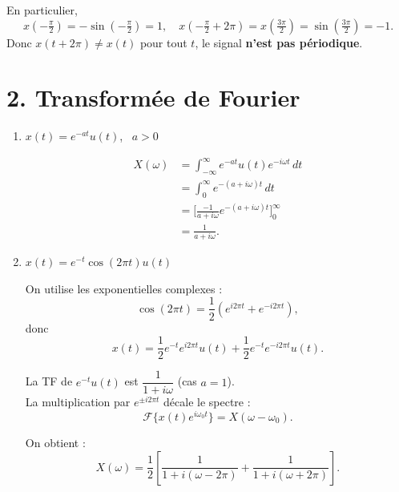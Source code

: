 \begin{solution}
\begin{enumerate}[label=(\alph*)]
        En particulier, 
        \[
           x(-\tfrac{\pi}{2}) = -\sin(-\tfrac{\pi}{2}) = 1, 
           \quad x(-\tfrac{\pi}{2} + 2\pi) = x(\tfrac{3\pi}{2}) = \sin(\tfrac{3\pi}{2}) = -1.
        \]
        Donc $x(t+2\pi) \neq x(t)$ pour tout $t$, le signal \textbf{n’est pas périodique}.
    \end{enumerate}
\end{solution}

\section*{2. Transformée de Fourier}

\begin{solution}
    \text{ }
    \begin{enumerate}[label=(\alph*)]
        \item $x(t) = e^{-at}u(t)$, \ $a>0$ 
        
        \[
        \begin{aligned}
          X(\omega) 
            &= \int_{-\infty}^{\infty} e^{-at}u(t)e^{-i\omega t}\,dt \\
            &= \int_0^{\infty} e^{-(a + i\omega)t}\,dt \\
            &= \bigg[ \frac{-1}{a+i\omega} e^{-(a+i\omega)t} \bigg]_0^{\infty} \\
            &= \frac{1}{a + i\omega}.
        \end{aligned}
        \]

        \item $x(t) = e^{-t}\cos(2\pi t)u(t)$

        On utilise les exponentielles complexes :
        \[
          \cos(2\pi t) = \frac{1}{2}\left(e^{i2\pi t} + e^{-i2\pi t}\right),
        \]
        donc
        \[
          x(t) = \frac{1}{2}e^{-t}e^{i2\pi t}u(t) + \frac{1}{2}e^{-t}e^{-i2\pi t}u(t).
        \]
    
        La TF de $e^{-t}u(t)$ est $\dfrac{1}{1+i\omega}$ (cas $a=1$).  \\
        La multiplication par $e^{\pm i2\pi t}$ décale le spectre :
        \[
          \mathcal{F}\{x(t)e^{i\omega_0 t}\} = X(\omega - \omega_0).
        \]
    
        On obtient :
        \[
          X(\omega) = \frac{1}{2}\left[\frac{1}{1 + i(\omega - 2\pi)} + \frac{1}{1 + i(\omega + 2\pi)}\right].
        \]


\end{enumerate}
\end{solution}

